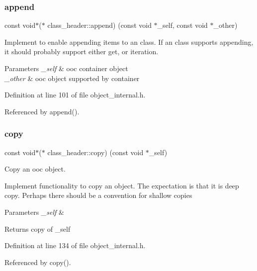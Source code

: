 \subsubsection{\texorpdfstring{append}{append}}
{\footnotesize\ttfamily const void$\ast$($\ast$ class\+\_\+header\+::append) (const void $\ast$\+\_\+self, const void $\ast$\+\_\+other)}

Implement to enable appending items to an class. If an class supports appending, it should probably support either get, or iteration.


\begin{DoxyParams}{Parameters}
{\em \+\_\+self} & ooc container object \\
\hline
{\em \+\_\+other} & ooc object supported by container \\
\hline
\end{DoxyParams}


Definition at line 101 of file object\+\_\+internal.\+h.



Referenced by append().

\mbox{\label{structclass__header_a26ec3e94c98bf5d3eff10d37cf2696ef}} 
\subsubsection{\texorpdfstring{copy}{copy}}
{\footnotesize\ttfamily const void$\ast$($\ast$ class\+\_\+header\+::copy) (const void $\ast$\+\_\+self)}

Copy an ooc object.

Implement functionality to copy an object. The expectation is that it is deep copy. Perhaps there should be a convention for shallow copies


\begin{DoxyParams}{Parameters}
{\em \+\_\+self} & \\
\hline
\end{DoxyParams}
\begin{DoxyReturn}{Returns}
copy of \+\_\+self 
\end{DoxyReturn}


Definition at line 134 of file object\+\_\+internal.\+h.



Referenced by copy().

\mbox{\label{structclass__header_a4d88d979ecf23c184577d937454ab973}} 
